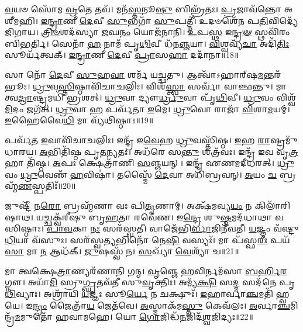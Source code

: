 \-\ul{𑌵}\-𑌯𑍞 𑌸𑍋᳴𑌮 \ul{𑌵𑍍𑌰}\-𑌤𑍇 𑌤𑌵᳴।
𑌮𑌨᳴\-\ul{𑌸𑍍𑌤}\-𑌨𑍂\-\ul{𑌷𑍁} 𑌬𑌿𑌭𑍍𑌰᳴𑌤𑌃।
\-\ul{𑌪𑍍𑌰}\-𑌜𑌾𑌵᳴𑌨𑍍𑌤𑍋 𑌅𑌶𑍀𑌮𑌹𑌿।
\-\ul{𑌇}\-\-\ul{𑌨𑍍𑌦𑍍𑌰𑌾}\-𑌣𑍀 \ul{𑌦𑍇}\-𑌵𑍀 \ul{𑌸𑍁}\-𑌭𑌗𑌾᳴ \ul{𑌸𑍁}\-𑌪𑌤𑍍𑌨𑍀॑।
𑌉𑌦𑍞𑌶𑍇᳴𑌨 𑌪\-\ul{𑌤𑌿}\-𑌵𑌿𑌦𑍍𑌯𑍇᳴ 𑌜𑌿𑌗𑌾𑌯।
\-\ul{𑌤𑍍𑌰𑌿}\-\-\ul{𑍞}\-𑌶𑌦᳴𑌸𑍍𑌯𑌾 \ul{𑌜}\-𑌘\-\ul{𑌨𑌂} 𑌯𑍋𑌜᳴𑌨𑌾𑌨𑌿।
\-\ul{𑌉}\-𑌪\-\ul{𑌸𑍍𑌥} 𑌇\-\ul{𑌨𑍍𑌦𑍍𑌰}\-\-\ul{𑍟} 𑌸𑍍𑌥𑌵𑌿᳴𑌰𑌂 𑌬𑌿𑌭𑌰𑍍𑌤𑌿।
𑌸𑍇𑌨𑌾᳴ \ul{𑌹} 𑌨𑌾𑌮᳴ 𑌪𑍃\-\ul{𑌥𑌿}\-𑌵𑍀 𑌧᳴𑌨\-\ul{𑌞𑍍𑌜}\-𑌯𑌾।
\-\ul{𑌵𑌿}\-𑌶𑍍𑌵𑌵𑍍𑌯᳴\-\ul{𑌚𑌾} 𑌅𑌦𑌿᳴\-\ul{𑌤𑌿𑌃} 𑌸𑍂𑌰𑍍𑌯᳴𑌤𑍍𑌵𑌕𑍍।
\-\ul{𑌇}\-\-\ul{𑌨𑍍𑌦𑍍𑌰𑌾}\-𑌣𑍀 \ul{𑌦𑍇}\-𑌵𑍀 \ul{𑌪𑍍𑌰𑌾}\-𑌸\-\ul{𑌹𑌾} 𑌦𑌦𑌾᳴𑌨𑌾॥18॥

𑌸𑌾 𑌨𑍋᳴ \ul{𑌦𑍇}\-𑌵𑍀 \ul{𑌸𑍁}\-𑌹\-\ul{𑌵𑌾} 𑌶𑌰𑍍𑌮᳴ 𑌯𑌚𑍍𑌛𑌤𑍁।
𑌆𑌤𑍍𑌵𑌾᳴\-𑌽𑌹𑌾𑌰𑍍‌\mbox{}𑌷\-\ul{𑌮}\-𑌨𑍍𑌤𑌰᳴𑌭𑍂𑌃।
\-\ul{𑌧𑍍𑌰𑍁}\-𑌵\-\ul{𑌸𑍍𑌤𑌿}\-𑌷𑍍𑌠𑌾𑌵𑌿᳴𑌚𑌾𑌚𑌲𑌿𑌃।
𑌵𑌿𑌶᳴\-\ul{𑌸𑍍𑌤𑍍𑌵𑌾} 𑌸𑌰𑍍𑌵𑌾᳴ 𑌵𑌾𑌞𑍍𑌛𑌨𑍍𑌤𑍁।
𑌮𑌾 𑌤𑍍𑌵\-\ul{𑌦𑍍𑌰𑌾}\-𑌷𑍍𑌟𑍍𑌰𑌮𑌧𑌿᳴ 𑌭𑍍𑌰𑌶𑌤𑍍।
\-\ul{𑌧𑍍𑌰𑍁}\-𑌵𑌾 𑌦𑍍𑌯𑍗\-\ul{𑌰𑍍𑌧𑍍𑌰𑍁}\-𑌵𑌾 𑌪𑍃᳴\-\ul{𑌥𑌿}\-𑌵𑍀।
\-\ul{𑌧𑍍𑌰𑍁}\-𑌵𑌂 𑌵𑌿𑌶𑍍𑌵᳴\-\ul{𑌮𑌿}\-𑌦𑌂 𑌜𑌗᳴𑌤𑍍।
\-\ul{𑌧𑍍𑌰𑍁}\-𑌵𑌾 \ul{𑌹} 𑌪𑌰𑍍𑌵᳴𑌤𑌾 \ul{𑌇}\-𑌮𑍇।
\-\ul{𑌧𑍍𑌰𑍁}\-𑌵𑍋 𑌰𑌾𑌜𑌾᳴ \ul{𑌵𑌿}\-𑌶𑌾\-\ul{𑌮}\-𑌯𑌮𑍍।
\-\ul{𑌇}\-𑌹𑍈𑌵𑍈\-\ul{𑌧𑌿} 𑌮𑌾 𑌵𑍍𑌯᳴𑌥𑌿𑌷𑍍𑌠𑌾𑌃॥19॥

𑌪𑌰𑍍𑌵᳴𑌤 \ul{𑌇}\-𑌵𑌾𑌵𑌿᳴𑌚𑌾𑌚𑌲𑌿𑌃।
𑌇𑌨𑍍𑌦𑍍𑌰᳴ 𑌇\-\ul{𑌵𑍇}\-𑌹 \ul{𑌧𑍍𑌰𑍁}\-𑌵𑌸𑍍𑌤𑌿᳴𑌷𑍍𑌠।
\-\ul{𑌇}\-𑌹 \ul{𑌰𑌾}\-𑌷𑍍𑌟𑍍𑌰𑌮𑍁᳴ 𑌧𑌾𑌰𑌯।
\-\ul{𑌅}\-𑌭𑌿𑌤𑌿᳴𑌷𑍍𑌠 𑌪𑍃𑌤\-\ul{𑌨𑍍𑌯}\-𑌤𑌃।
𑌅𑌧᳴𑌰𑍇 𑌸\-\ul{𑌨𑍍𑌤𑍁} 𑌶𑌤𑍍𑌰᳴𑌵𑌃।
𑌇𑌨𑍍𑌦𑍍𑌰᳴ 𑌇𑌵 𑌵𑍃\-\ul{𑌤𑍍𑌰}\-𑌹𑌾 𑌤𑌿᳴𑌷𑍍𑌠।
\-\ul{𑌅}\-𑌪𑌃 𑌕𑍍𑌷𑍇𑌤𑍍𑌰𑌾᳴𑌣𑌿 \ul{𑌸}\-𑌞𑍍𑌜𑌯𑌨𑍍।
𑌇𑌨𑍍𑌦𑍍𑌰᳴ 𑌏𑌣𑌮𑌦𑍀𑌧𑌰𑌤𑍍।
\-\ul{𑌧𑍍𑌰𑍁}\-𑌵𑌂 \ul{𑌧𑍍𑌰𑍁}\-𑌵𑍇𑌣᳴ \ul{𑌹}\-𑌵𑌿𑌷𑌾॑।
𑌤𑌸𑍍𑌮𑍈᳴ \ul{𑌦𑍇}\-𑌵𑌾 𑌅𑌧𑌿᳴𑌬𑍍𑌰𑌵𑌨𑍍।
\-\ul{𑌅}\-𑌯𑌂 \ul{𑌚} 𑌬𑍍𑌰𑌹𑍍𑌮᳴\-\ul{𑌣}\-𑌸𑍍𑌪𑌤𑌿𑌃᳴॥20॥\anuvakamend[\-\ul{𑌹}\-𑌵𑌿𑌰𑍍𑌭𑌿᳴\-\ul{𑌰𑌾}\-𑌸𑍍𑌯᳴𑌮\-\ul{𑌭𑌿} 𑌦𑌾𑌸᳴𑌤𑍋 𑌵𑌿\-\ul{𑌪}\-𑌶𑍍𑌚𑌿\-\ul{𑌤}\-𑌮𑌪𑍍𑌰᳴𑌯𑌾𑌵\-\ul{𑌞𑍍𑌜𑍀}\-𑌵\-\ul{𑌸𑍇} 𑌦𑌦𑌾᳴𑌨𑌾 𑌵𑍍𑌯𑌥𑌿𑌷𑍍𑌠𑌾 𑌬𑍍𑌰\-\ul{𑌵}\-𑌨𑍍𑌨𑍇𑌕𑌂᳴ 𑌚]

𑌜𑍁𑌷𑍍𑌟𑍀᳴ 𑌨\-\ul{𑌰𑍋} 𑌬𑍍𑌰𑌹𑍍𑌮᳴𑌣𑌾 𑌵𑌃 𑌪𑌿\-\ul{𑌤𑍃}\-𑌣𑌾𑌮𑍍।
𑌅𑌕𑍍𑌷᳴𑌮𑌵𑍍𑌯\-\ul{𑌯𑌂} 𑌨 𑌕𑌿𑌲𑌾᳴𑌰𑌿𑌷𑌾𑌥।
𑌯𑌚𑍍𑌛𑌕𑍍𑌵᳴𑌰𑍀𑌷𑍁 𑌬𑍃\-\ul{𑌹}\-𑌤𑌾 𑌰𑌵𑍇᳴𑌣।
𑌇\-\ul{𑌨𑍍𑌦𑍍𑌰𑍇} 𑌶𑍁\-\ul{𑌷𑍍𑌮}\-𑌮𑌦᳴𑌧𑌾𑌥𑌾 𑌵𑌸𑌿𑌷𑍍𑌠𑌾𑌃।
\-\ul{𑌪𑌾}\-\-\ul{𑌵}\-𑌕𑌾 \ul{𑌨𑌃} 𑌸𑌰᳴𑌸𑍍𑌵𑌤𑍀।
𑌵𑌾𑌜𑍇᳴𑌭𑌿\-\ul{𑌰𑍍𑌵𑌾}\-𑌜𑌿𑌨𑍀᳴𑌵𑌤𑍀।
\-\ul{𑌯}\-𑌜𑍍𑌞𑌂 𑌵᳴𑌷𑍍𑌟𑍁 \ul{𑌧𑌿}\-𑌯𑌾 𑌵᳴𑌸𑍁𑌃।
𑌸𑌰᳴𑌸𑍍𑌵\-\ul{𑌤𑍍𑌯}\-𑌭𑌿𑌨𑍋᳴ 𑌨𑍇\-\ul{𑌷𑌿} 𑌵𑌸𑍍𑌯𑌃᳴।
𑌮𑌾 𑌪᳴𑌸𑍍𑌫\-\ul{𑌰𑍀𑌃} 𑌪𑌯᳴\-\ul{𑌸𑌾} 𑌮𑌾 \ul{𑌨} 𑌆𑌧᳴𑌕𑍍।
\-\ul{𑌜𑍁}\-𑌷𑌸𑍍𑌵᳴ 𑌨𑌃 \ul{𑌸}\-𑌖𑍍𑌯𑌾᳴ \ul{𑌵𑍇}\-𑌶𑍍𑌯𑌾᳴ 𑌚॥21॥

𑌮𑌾 𑌤𑍍𑌵𑌕𑍍𑌷𑍇\-\ul{𑌤𑍍𑌰𑌾}\-𑌣𑍍𑌯𑌰᳴𑌣𑌾𑌨𑌿 𑌗𑌨𑍍𑌮।
\-\ul{𑌵𑍃}\-𑌞𑍍𑌜𑍇 \ul{𑌹}\-𑌵𑌿𑌰𑍍𑌨𑌮᳴𑌸𑌾 \ul{𑌬}\-\-\ul{𑌰𑍍}\-𑌹𑌿\-\ul{𑌰}\-𑌗𑍍𑌨𑍗।
𑌅𑌯𑌾᳴\-\ul{𑌮𑌿} 𑌸𑍍𑌰𑍁\-\ul{𑌗𑍍𑌘𑍃}\-𑌤𑌵᳴𑌤𑍀 𑌸𑍁\-\ul{𑌵𑍃}\-𑌕𑍍𑌤𑌿𑌃।
𑌅𑌮𑍍𑌯᳴\-\ul{𑌕𑍍𑌷𑌿} 𑌸\-\ul{𑌦𑍍𑌮} 𑌸𑌦᳴𑌨𑍇 𑌪𑍃\-\ul{𑌥𑌿}\-𑌵𑍍𑌯𑌾𑌃।
𑌅𑌶𑍍𑌰𑌾᳴𑌯𑌿 \ul{𑌯}\-𑌜𑍍𑌞𑌃 𑌸𑍂\-\ul{𑌰𑍍𑌯𑍇} 𑌨 𑌚𑌕𑍍𑌷𑍁𑌃᳴।
\-\ul{𑌇}\-𑌹𑌾𑌰𑍍𑌵𑌾\-\ul{𑌞𑍍𑌚}\-𑌮𑌤𑌿᳴ 𑌹𑍍𑌵𑌯𑍇।
𑌇\-\ul{𑌨𑍍𑌦𑍍𑌰𑌂} 𑌜𑍈𑌤𑍍𑌰𑌾᳴\-\ul{𑌯} 𑌜𑍇𑌤᳴𑌵𑍇।
\-\ul{𑌅}\-𑌸𑍍𑌮𑌾𑌕᳴𑌮\-\ul{𑌸𑍍𑌤𑍁} 𑌕𑍇𑌵᳴𑌲𑌃।
\-\ul{𑌅}\-𑌰𑍍𑌵𑌾\-\ul{𑌞𑍍𑌚}\-𑌮𑌿𑌨𑍍𑌦𑍍𑌰᳴\-\ul{𑌮}\-𑌮𑍁𑌤𑍋᳴ 𑌹𑌵𑌾𑌮𑌹𑍇।
𑌯𑍋 \ul{𑌗𑍋}\-𑌜𑌿𑌦𑍍𑌧᳴\-\ul{𑌨}\-𑌜𑌿𑌦᳴\-\ul{𑌶𑍍𑌵}\-\-𑌜𑌿𑌦𑍍𑌯𑌃॥22॥

